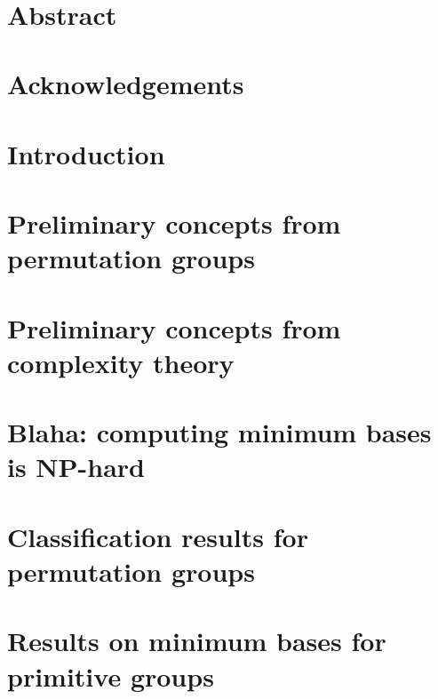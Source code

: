 \documentclass[openany]{book}
\title{\textbf{\TITLE}}
\author{\textbf{\AUTHOR}}
\date{\textbf{\DATE}}
\begin{document}



\chapter*{Abstract}



\chapter*{Acknowledgements}



\tableofcontents

\chapter{Introduction}




\chapter{Preliminary concepts from permutation groups}



\chapter{Preliminary concepts from complexity theory}



\chapter{Blaha: computing minimum bases is NP-hard}



\chapter{Classification results for permutation groups}



\chapter{Results on minimum bases for primitive groups}



\nocite{*}
\renewcommand{\bibname}{References}

\appendix


\end{document}
